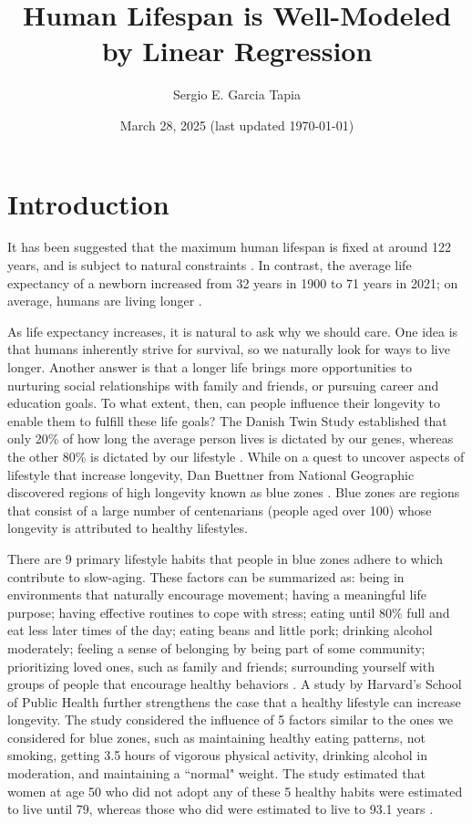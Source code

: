 \documentclass[12pt]{article}
\title{Human Lifespan is Well-Modeled by Linear Regression}
\author{Sergio E. Garcia Tapia}
\date{March 28, 2025 (last updated \today)}
\begin{document}
	\maketitle
	\section{Introduction}
	It has been suggested that the maximum human lifespan is fixed at around
	122 years, and is subject to natural constraints \cite{NLoM-maximal-lifespan}.
	In contrast, the average life expectancy of a newborn increased from 32 years in 1900 to
	71 years in 2021; on average, humans are living longer \cite{owid-life-expectancy}.
	
	As life expectancy increases, it is natural to ask why we should care.
	One idea is that humans inherently strive for survival, so we naturally look
	for ways to live longer. Another answer is that a longer life brings more
	opportunities to nurturing social relationships with family and friends,
	or pursuing career and education goals. To what extent, then, can people influence their
	longevity to enable them to fulfill these life goals? The Danish Twin Study
	established that only 20\% of how long the average person lives is dictated by our
	genes, whereas the other 80\% is dictated by our lifestyle \cite{PMC-blue-zones}.
	While on a quest to uncover aspects of lifestyle that increase longevity,
	Dan Buettner from National Geographic discovered regions of high longevity known
	as blue zones \cite{PMC-blue-zones}. Blue zones are regions that consist of a large
	number of centenarians (people aged over 100) whose longevity is attributed to healthy
	lifestyles.
	
	There are 9 primary lifestyle habits that people in blue zones adhere to which
	contribute to slow-aging. These factors can be summarized as: being in environments that
	naturally encourage movement; having a meaningful life purpose; having effective routines to
	cope with stress; eating  until 80\% full and eat less later times of the day; eating beans
	and little pork; drinking alcohol moderately; feeling a sense of belonging by being part of
	some community; prioritizing loved ones, such as family and friends; surrounding yourself
	with groups of people that encourage healthy behaviors \cite{PMC-blue-zones}.
	A study by Harvard's School of Public Health further strengthens the case
	that a healthy lifestyle can increase longevity. The study considered the influence
	of 5 factors similar to the ones we considered for blue zones, such as maintaining
	healthy eating patterns, not smoking, getting 3.5 hours of vigorous physical
	activity, drinking alcohol in moderation, and maintaining a ``normal" weight.
	The study estimated that women at age 50 who did not adopt any of these 5 healthy
	habits were estimated to live until 79, whereas those who did were estimated to live
	to 93.1 years \cite{NIH-healthy-habits}.
	
\end{document}
